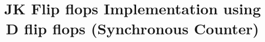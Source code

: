 \documentclass[journal,12pt,twocolumn]{IEEEtran}
\begin{document}
	
	
	\makeatletter
	\makeatother
	
	\let\StandardTheFigure\thefigure
	\let\StandardTheTable\thetable
	\renewcommand{\thetable}{\theproblem}
	
	
	\def\putbox#1#2#3{\makebox[0in][l]{\makebox[#1][l]{}\raisebox{\baselineskip}[0in][0in]{\raisebox{#2}[0in][0in]{#3}}}}
     \def\rightbox#1{\makebox[0in][r]{#1}}
     \def\centbox#1{\makebox[0in]{#1}}
     \def\topbox#1{\raisebox{-\baselineskip}[0in][0in]{#1}}
     \def\midbox#1{\raisebox{-0.5\baselineskip}[0in][0in]{#1}}
	
	\vspace{3cm}
	\title{
		
		\centering
		JK Flip flops Implementation using D flip flops (Synchronous Counter)
		\centering
		
	}

	
	
	
\end{document}
